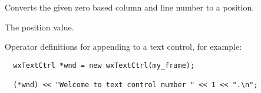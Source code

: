\label{wxtextctrlxytoposition}


Converts the given zero based column and line number to a position.





The position value.


\label{wxtextctrlinsert}







Operator definitions for appending to a text control, for example:

\begin{verbatim}
  wxTextCtrl *wnd = new wxTextCtrl(my_frame);

  (*wnd) << "Welcome to text control number " << 1 << ".\n";
\end{verbatim}

